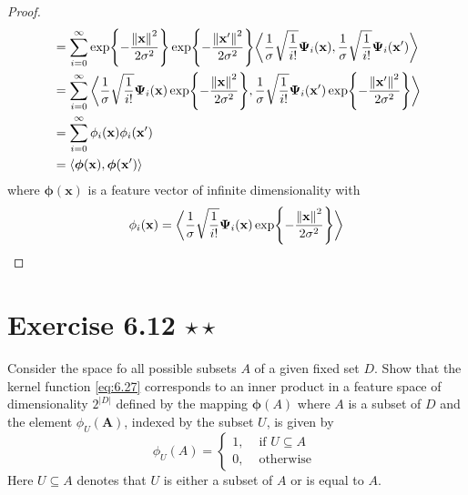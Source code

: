 \begin{proof}
\begin{align*}
        &= \sum_{i=0}^{\infty} 
        \exp{-\frac{\norm{\mathbf{x}}^2}{2\sigma^2}}
        \exp{-\frac{\norm{\mathbf{x}'}^2}{2\sigma^2}}
        \bigg\langle \frac{1}{\sigma}\sqrt{\frac{1}{i!}} \bm{\Psi}_i(\mathbf{x}),
        \frac{1}{\sigma}\sqrt{\frac{1}{i!}} \bm{\Psi}_i(\mathbf{x}') \bigg\rangle \\
        &= \sum_{i=0}^{\infty} \bigg\langle
        \frac{1}{\sigma}\sqrt{\frac{1}{i!}} \bm{\Psi}_i(\mathbf{x})
        \exp{-\frac{\norm{\mathbf{x}}^2}{2\sigma^2}},
        \frac{1}{\sigma}\sqrt{\frac{1}{i!}} \bm{\Psi}_i(\mathbf{x}')
        \exp{-\frac{\norm{\mathbf{x}'}^2}{2\sigma^2}} \bigg\rangle \\ 
        &= \sum_{i=0}^{\infty} \phi_i(\mathbf{x}) \phi_i(\mathbf{x}') \\
        &= \langle \bm{\phi}(\mathbf{x}), \bm{\phi}(\mathbf{x}') \rangle
    \end{align*}
    where $\bm{\phi}(\mathbf{x})$ is a feature vector of infinite dimensionality with
    \[
        \phi_i(\mathbf{x}) = 
        \bigg\langle
        \frac{1}{\sigma}\sqrt{\frac{1}{i!}} \bm{\Psi}_i(\mathbf{x})
        \exp{-\frac{\norm{\mathbf{x}}^2}{2\sigma^2}}\bigg\rangle
    \] 
\end{proof}

\section*{Exercise 6.12 $\star \star$}
Consider the space fo all possible subsets $A$ of a given fixed set $D$.
Show that the kernel function \eqref{eq:6.27} corresponds to an inner product in a feature
space of dimensionality $2^{|D|}$ defined by the mapping $\bm{\phi}(A)$ where $A$ 
is a subset of $D$ and the element $\phi_U(\mathbf{A})$, indexed by the subset
$U$, is given by
\begin{equation}\label{eq:6.95}\tag{6.95}
    \phi_U(A) = \begin{cases}
        1, & \text{ if }  U \subseteq A \\
        0, & \text{ otherwise }
    \end{cases}
\end{equation}
Here $U \subseteq A$ denotes that $U$ is either a subset of $A$ or is equal to $A$. 

\vspace{1em}

